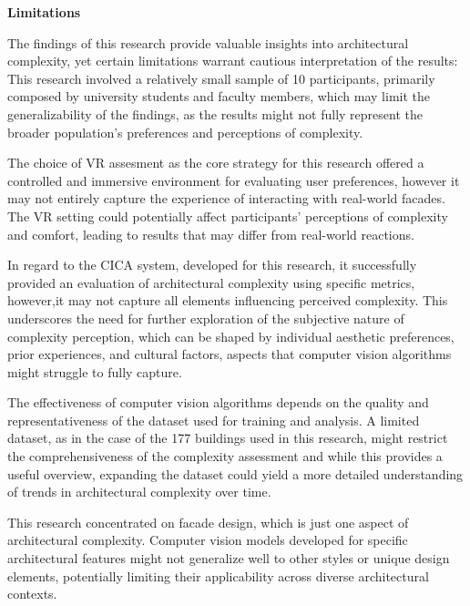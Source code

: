
\textbf{Limitations}

The findings of this research provide valuable insights  into architectural complexity, yet certain limitations warrant cautious interpretation of the results:
This research involved a relatively small sample of 10 participants, primarily composed by university students and faculty members, which may limit the generalizability of the findings, as the results might not fully represent the broader population's preferences and perceptions of complexity.

The choice of VR assesment as the core strategy for this research offered a controlled and immersive environment for evaluating user preferences, however it may not entirely capture the experience of interacting with real-world facades.
The VR setting could potentially affect participants' perceptions of complexity and comfort, leading to results that may differ from real-world reactions.

In regard to the CICA system, developed for this research, it successfully provided an evaluation of architectural complexity using specific metrics, however,it may not capture all elements influencing perceived complexity.
This underscores the need for further exploration of the subjective nature of complexity perception, which can be shaped by individual aesthetic preferences, prior experiences, and cultural factors, aspects that computer vision algorithms might struggle to fully capture.

The effectiveness of computer vision algorithms depends on the quality and representativeness of the dataset used for training and analysis.
A limited dataset, as in the case of the 177 buildings used in this research, might restrict the comprehensiveness of the complexity assessment and while this provides a useful overview, expanding the dataset could yield a more detailed understanding of trends in architectural complexity over time.

This research concentrated on facade design, which is just one aspect of architectural complexity.
Computer vision models developed for specific architectural features might not generalize well to other styles or unique design elements, potentially limiting their applicability across diverse architectural contexts.


